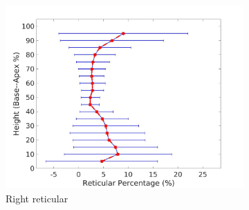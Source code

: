 \begin{figure}[H]
\begin{subfigure}{.42\linewidth}
  \includegraphics[width=\linewidth,trim={{.0\wd0} {.0\wd0} {.0\wd0} {.0\wd0}},clip]{QuantitativeAnalysis/Image/RightLungReticularDiseaseAgainstHeight.jpg}
  \caption{Right reticular}
  \label{fig:DiseaseAgainstHeight-d}
\end{subfigure}
\begin{subfigure}{.42\linewidth}%

\end{subfigure}
\end{figure}
